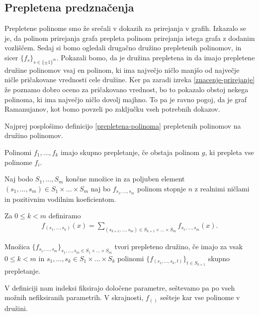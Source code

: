 \subsection{Prepletena predznačenja}
Prepletene polinome smo že srečali v dokazih za prirejanja v grafih. Izkazalo se je, da polinom prirejanja grafa prepleta polinom prirejanja istega grafa z dodanim vozliščem. Sedaj si bomo ogledali drugačno družino prepletenih polinomov, in sicer \(\{f_s\}_{s\in \{\pm 1\}^m}\). Pokazali bomo, da je družina prepletena in da imajo prepletene družine polinomov vsaj en polinom, ki ima največjo ničlo manjšo od največje ničle pričakovane vrednosti cele družine. Ker pa zaradi izreka \ref{znacenje-prirejanje} že poznamo dobro oceno za pričakovano vrednost, bo to pokazalo obstoj nekega polinoma, ki ima največjo ničlo dovolj majhno. To pa je ravno pogoj, da je graf Ramanujanov, kot bomo povzeli po zaključku vseh potrebnih dokazov.

Najprej posplošimo definicijo \ref{prepletena-polinoma} prepletenih polinomov na družino polinomov.
\begin{definicija}
    Polinomi \(f_1, \ldots, f_k\) imajo skupno prepletanje, če obstaja polinom \(g\), ki prepleta vse polinome \(f_i\).
\end{definicija}
\begin{definicija}\label{prepletena-druzina}
    Naj bodo \(S_1, \ldots, S_m\) končne množice in za poljuben element \((s_1, \ldots, s_m)\in S_1\times \ldots \times S_m\) naj bo \(f_{s_1, \ldots, s_m}\) polinom stopnje \(n\) z realnimi ničlami in pozitivnim vodilnim koeficientom.

    Za \(0\leq k<m\) definiramo
    \begin{align*}
        f_{(s_1, \ldots, s_k)}(x) = \sum_{(s_{k+1}, \ldots, s_m)\in S_{k+1}\times \ldots \times S_m} f_{s_1, \ldots, s_m}(x).
    \end{align*}

    Množica \(\{f_{s_1,\ldots, s_m}\}_{s_1,\ldots, s_m\in S_1\times \ldots \times S_m}\) tvori prepleteno družino, če imajo za vsak \(0\leq k<m\) in \(s_1, \ldots, s_k\in S_1\times \ldots \times S_k\) polinomi \(\{f_{(s_1, \ldots, s_k, t)}\}_{t\in S_{k+1}}\)  skupno prepletanje.
\end{definicija}
V definiciji nam indeksi fiksirajo določene parametre, seštevamo pa po vseh možnih nefiksiranih parametrih. V skrajnosti, \(f_{()}\) sešteje kar vse polinome v družini.

